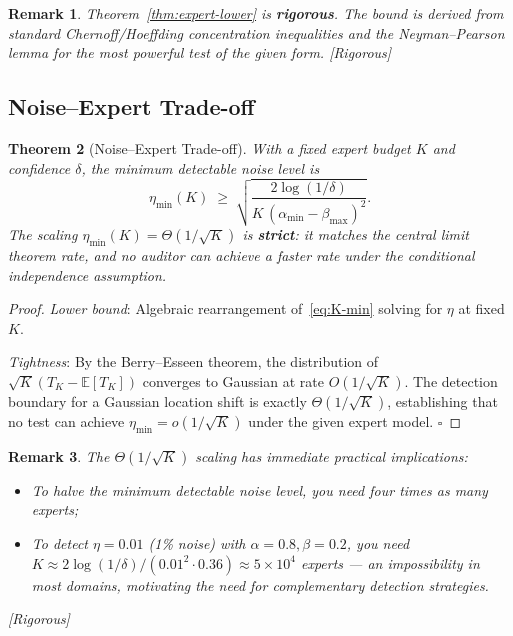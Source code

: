 \documentclass[12pt,a4paper]{article}
\newtheorem{theorem}{Theorem}[section]
\newtheorem{remark}[theorem]{Remark}
\newcommand{\rigorous}{\textcolor{green!50!black}{\small\textsf{[Rigorous]}}}
\newcommand{\E}{\mathbb{E}}
\begin{document}
\begin{remark}
Theorem~\ref{thm:expert-lower} is \textbf{rigorous}.  The bound is derived from
standard Chernoff/Hoeffding concentration inequalities and the Neyman--Pearson
lemma for the most powerful test of the given form.  \rigorous
\end{remark}

\subsection{Noise--Expert Trade-off}

\begin{theorem}[Noise--Expert Trade-off]
\label{thm:noise-expert}
With a fixed expert budget $K$ and confidence $\delta$, the minimum detectable
noise level is
\begin{equation}\label{eq:eta-min}
    \eta_{\min}(K) \;\geq\;
    \sqrt{\frac{2\log(1/\delta)}
               {K\,(\alpha_{\min}-\beta_{\max})^2}}.
\end{equation}
The scaling $\eta_{\min}(K) = \Theta(1/\sqrt{K})$ is \textbf{strict}: it
matches the central limit theorem rate, and no auditor can achieve a faster
rate under the conditional independence assumption.
\end{theorem}

\begin{proof}
\textit{Lower bound}: Algebraic rearrangement of~\eqref{eq:K-min} solving for
$\eta$ at fixed $K$.

\textit{Tightness}: By the Berry--Esseen theorem, the distribution of
$\sqrt{K}(T_K-\E[T_K])$ converges to Gaussian at rate $O(1/\sqrt{K})$.
The detection boundary for a Gaussian location shift is exactly
$\Theta(1/\sqrt{K})$, establishing that no test can achieve
$\eta_{\min}=o(1/\sqrt{K})$ under the given expert model. $\square$
\end{proof}

\begin{remark}
The $\Theta(1/\sqrt{K})$ scaling has immediate practical implications:
\begin{itemize}
    \item To halve the minimum detectable noise level, you need \emph{four times}
          as many experts;
    \item To detect $\eta=0.01$ (1\% noise) with $\alpha=0.8,\beta=0.2$, you
          need $K\approx 2\log(1/\delta)/(0.01^2\cdot0.36)\approx 5\times10^4$
          experts — an impossibility in most domains, motivating the need for
          complementary detection strategies.
\end{itemize}
\rigorous
\end{remark}
\end{document}
